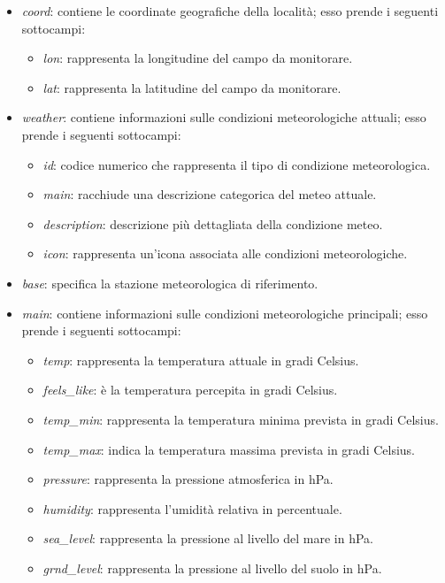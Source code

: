 \begin{itemize}
    \item \textit{coord}: contiene le coordinate geografiche della località; esso prende i seguenti sottocampi:
    \begin{itemize}
        \item \textit{lon}: rappresenta la longitudine del campo da monitorare.
        \item \textit{lat}: rappresenta la latitudine del campo da monitorare.
    \end{itemize}

    \item \textit{weather}: contiene informazioni sulle condizioni meteorologiche attuali; esso prende i seguenti sottocampi:
    \begin{itemize}
        \item \textit{id}: codice numerico che rappresenta il tipo di condizione meteorologica.
        \item \textit{main}: racchiude una descrizione categorica del meteo attuale.
        \item \textit{description}: descrizione più dettagliata della condizione meteo.
        \item \textit{icon}: rappresenta un'icona associata alle condizioni meteorologiche.
    \end{itemize}
    \item \textit{base}: specifica la stazione meteorologica di riferimento.
    \item \textit{main}: contiene informazioni sulle condizioni meteorologiche principali; esso prende i seguenti sottocampi:
    \begin{itemize}
        \item \textit{temp}: rappresenta la temperatura attuale in gradi Celsius.
        \item \textit{feels\_like}: è la temperatura percepita in gradi Celsius.
        \item \textit{temp\_min}: rappresenta la temperatura minima prevista in gradi Celsius.
        \item \textit{temp\_max}: indica la temperatura massima prevista in gradi Celsius.
        \item \textit{pressure}: rappresenta la pressione atmosferica in hPa.
        \item \textit{humidity}: rappresenta l'umidità relativa in percentuale.
        \item \textit{sea\_level}: rappresenta la pressione al livello del mare in hPa.
        \item \textit{grnd\_level}: rappresenta la pressione al livello del suolo in hPa.
    \end{itemize}
        

\end{itemize}
